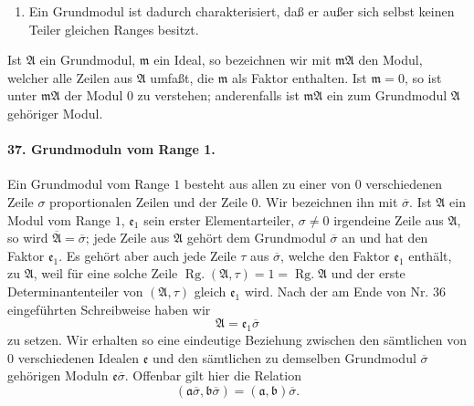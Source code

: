 \documentclass[11pt]{article}
\newcommand{\Rg}{\operatorname{Rg.}}
\begin{document}
\begin{enumerate}
\item[5)] Ein Grundmodul ist dadurch charakterisiert, daß er außer sich selbst keinen Teiler gleichen Ranges besitzt.
\end{enumerate}

Ist $\mathfrak A$ ein Grundmodul, $\mathfrak m$ ein Ideal, so bezeichnen wir mit $\mathfrak m\mathfrak A$ den Modul, welcher alle Zeilen aus $\mathfrak A$ umfaßt, die $\mathfrak m$ als Faktor enthalten. Ist $\mathfrak m=0$, so ist unter $\mathfrak m\mathfrak A$ der Modul $0$ zu verstehen; anderenfalls ist $\mathfrak m\mathfrak A$ ein zum Grundmodul $\mathfrak A$ gehöriger Modul.

\paragraph{37. Grundmoduln vom Range 1.}
Ein Grundmodul vom Range $1$ besteht aus allen zu einer von $0$ verschiedenen Zeile $\sigma$ proportionalen Zeilen und der Zeile $0$. Wir bezeichnen ihn mit $\overline{\sigma}$. Ist $\mathfrak A$ ein Modul vom Range $1$, $\mathfrak e_1$ sein erster Elementarteiler, $\sigma\ne0$ irgendeine Zeile aus $\mathfrak A$, so wird $\overline{\mathfrak A}=\overline{\sigma}$; jede Zeile aus $\mathfrak A$ gehört dem Grundmodul $\overline{\sigma}$ an und hat den Faktor $\mathfrak e_1$. Es gehört aber auch jede Zeile $\tau$ aus $\overline{\sigma}$, welche den Faktor $\mathfrak e_1$ enthält, zu $\mathfrak A$, weil für eine solche Zeile $\Rg(\mathfrak A,\tau)=1=\Rg\mathfrak A$ und der erste Determinantenteiler von $(\mathfrak A,\tau)$ gleich $\mathfrak e_1$ wird. Nach der am Ende von Nr. 36 eingeführten Schreibweise haben wir
\[
\mathfrak A=\mathfrak e_1\overline{\sigma}
\]
zu setzen. Wir erhalten so eine eindeutige Beziehung zwischen den sämtlichen von $0$ verschiedenen Idealen $\mathfrak e$ und den sämtlichen zu demselben Grundmodul $\overline{\sigma}$ gehörigen Moduln $\mathfrak e\overline{\sigma}$. Offenbar gilt hier die Relation
\begin{equation}
(\mathfrak a\overline{\sigma},\mathfrak b\overline{\sigma})=(\mathfrak a,\mathfrak b)\overline{\sigma}.
\tag{46}
\end{equation}
\end{document}

